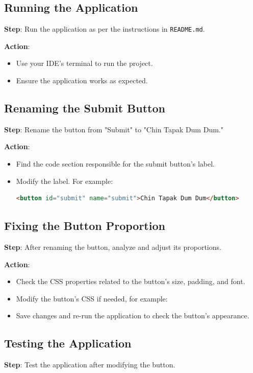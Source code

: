 \documentclass{article}
\begin{document}
\subsection{Running the Application}
\textbf{Step}: Run the application as per the instructions in \texttt{README.md}.

\textbf{Action}:
\begin{itemize}
    \item Use your IDE's terminal to run the project.
    \item Ensure the application works as expected.
\end{itemize}

\subsection{Renaming the Submit Button}
\textbf{Step}: Rename the button from "Submit" to "Chin Tapak Dum Dum."

\textbf{Action}:
\begin{itemize}
    \item Find the code section responsible for the submit button's label.
    \item Modify the label. For example:
    \begin{lstlisting}[language=HTML]
    <button id="submit" name="submit">Chin Tapak Dum Dum</button>
    \end{lstlisting}
\end{itemize}

\subsection{Fixing the Button Proportion}
\textbf{Step}: After renaming the button, analyze and adjust its proportions.

\textbf{Action}:
\begin{itemize}
    \item Check the CSS properties related to the button's size, padding, and font.
    \item Modify the button’s CSS if needed, for example:
    \item Save changes and re-run the application to check the button's appearance.
\end{itemize}

\subsection{Testing the Application}
\textbf{Step}: Test the application after modifying the button.
\end{document}

